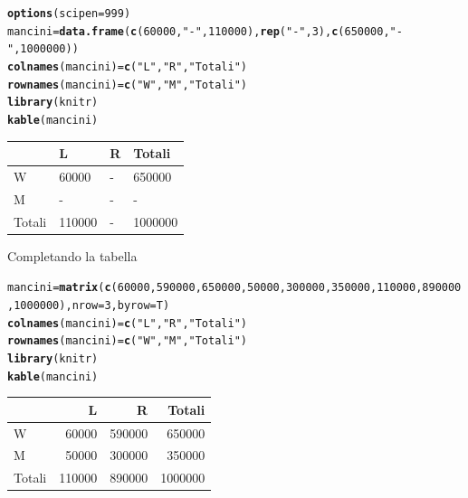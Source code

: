\documentclass[onecolumn,12pt]{book}\usepackage[]{graphicx}\usepackage[]{color}
\makeatletter
\newcommand{\hlnum}[1]{\textcolor[rgb]{0.686,0.059,0.569}{#1}}%
\newcommand{\hlstr}[1]{\textcolor[rgb]{0.192,0.494,0.8}{#1}}%
\newcommand{\hlstd}[1]{\textcolor[rgb]{0.345,0.345,0.345}{#1}}%
\newcommand{\hlkwb}[1]{\textcolor[rgb]{0.69,0.353,0.396}{#1}}%
\newcommand{\hlkwc}[1]{\textcolor[rgb]{0.333,0.667,0.333}{#1}}%
\newcommand{\hlkwd}[1]{\textcolor[rgb]{0.737,0.353,0.396}{\textbf{#1}}}%
\newenvironment{kframe}{%
 \def\at@end@of@kframe{}%
 \ifinner\ifhmode%
  \def\at@end@of@kframe{\end{minipage}}%
  \begin{minipage}{\columnwidth}%
 \fi\fi%
 \def\FrameCommand##1{\hskip\@totalleftmargin \hskip-\fboxsep
 \colorbox{shadecolor}{##1}\hskip-\fboxsep
     \hskip-\linewidth \hskip-\@totalleftmargin \hskip\columnwidth}%
 \MakeFramed {\advance\hsize-\width
   \@totalleftmargin\z@ \linewidth\hsize
   \@setminipage}}%
 {\par\unskip\endMakeFramed%
 \at@end@of@kframe}
\newenvironment{knitrout}{}{} %
\makeatother
\begin{document}
\begin{knitrout}
\color{fgcolor}\begin{kframe}
\begin{alltt}
\hlkwd{options}\hlstd{(}\hlkwc{scipen}\hlstd{=}\hlnum{999}\hlstd{)}
\hlstd{mancini}\hlkwb{=}\hlkwd{data.frame}\hlstd{(}\hlkwd{c}\hlstd{(}\hlnum{60000}\hlstd{,}\hlstr{"-"}\hlstd{,}\hlnum{110000}\hlstd{),}\hlkwd{rep}\hlstd{(}\hlstr{"-"}\hlstd{,}\hlnum{3}\hlstd{),}\hlkwd{c}\hlstd{(}\hlnum{650000}\hlstd{,}\hlstr{"-"}\hlstd{,} \hlnum{1000000}\hlstd{))}
\hlkwd{colnames}\hlstd{(mancini)}\hlkwb{=}\hlkwd{c}\hlstd{(}  \hlstr{"L"}\hlstd{,} \hlstr{"R"}\hlstd{,} \hlstr{"Totali"}\hlstd{)}
\hlkwd{rownames}\hlstd{(mancini)}\hlkwb{=}\hlkwd{c}\hlstd{(}\hlstr{"W"}\hlstd{,} \hlstr{"M"}\hlstd{,} \hlstr{"Totali"}\hlstd{)}
 \hlkwd{library}\hlstd{(knitr)}
\hlkwd{kable}\hlstd{(mancini)}
\end{alltt}
\end{kframe}
\begin{tabular}{l|l|l|l}
\hline
  & L & R & Totali\\
\hline
W & 60000 & - & 650000\\
\hline
M & - & - & -\\
\hline
Totali & 110000 & - & 1000000\\
\hline
\end{tabular}


\end{knitrout}

Completando la tabella


\begin{knitrout}
\color{fgcolor}\begin{kframe}
\begin{alltt}
\hlstd{mancini}\hlkwb{=}\hlkwd{matrix}\hlstd{(}\hlkwd{c}\hlstd{(}\hlnum{60000}\hlstd{,}\hlnum{590000}\hlstd{,}\hlnum{650000}\hlstd{,}\hlnum{50000}\hlstd{,} \hlnum{300000}\hlstd{,} \hlnum{350000}\hlstd{,}  \hlnum{110000}\hlstd{,} \hlnum{890000}\hlstd{,} \hlnum{1000000}\hlstd{),}\hlkwc{nrow}\hlstd{=}\hlnum{3}\hlstd{,}\hlkwc{byrow}\hlstd{=T)}
\hlkwd{colnames}\hlstd{(mancini)}\hlkwb{=}\hlkwd{c}\hlstd{(}  \hlstr{"L"}\hlstd{,} \hlstr{"R"}\hlstd{,} \hlstr{"Totali"}\hlstd{)}
\hlkwd{rownames}\hlstd{(mancini)}\hlkwb{=}\hlkwd{c}\hlstd{(}\hlstr{"W"}\hlstd{,} \hlstr{"M"}\hlstd{,} \hlstr{"Totali"}\hlstd{)}
 \hlkwd{library}\hlstd{(knitr)}
\hlkwd{kable}\hlstd{(mancini)}
\end{alltt}
\end{kframe}
\begin{tabular}{l|r|r|r}
\hline
  & L & R & Totali\\
\hline
W & 60000 & 590000 & 650000\\
\hline
M & 50000 & 300000 & 350000\\
\hline
Totali & 110000 & 890000 & 1000000\\
\hline
\end{tabular}


\end{knitrout}
\end{document}
